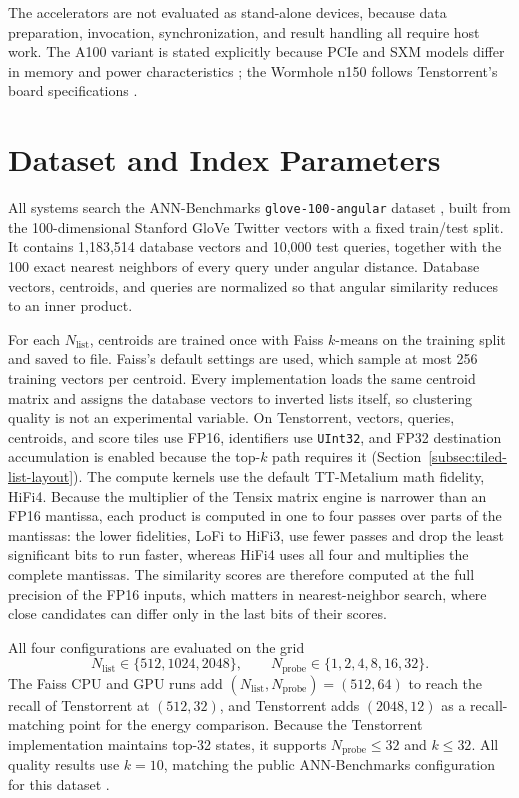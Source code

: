 The accelerators are not evaluated as stand-alone devices, because data
preparation, invocation, synchronization, and result handling all require host
work. The A100 variant is stated explicitly because PCIe and SXM models differ
in memory and power characteristics \cite{nvidia_a100_spec}; the Wormhole n150
follows Tenstorrent's board specifications \cite{tenstorrent_wormhole_spec}.

\section{Dataset and Index Parameters}
\label{sec:dataset-index-parameters}

All systems search the ANN-Benchmarks \texttt{glove-100-angular} dataset
\cite{ann_benchmarks,ann_benchmarks_datasets}, built from the 100-dimensional
Stanford GloVe Twitter vectors \cite{pennington_glove} with a fixed train/test
split. It contains 1,183,514 database vectors and 10,000 test queries, together
with the 100 exact nearest neighbors of every query under angular distance.
Database vectors, centroids, and queries are normalized so that angular
similarity reduces to an inner product.

For each \(N_{\mathrm{list}}\), centroids are trained once with Faiss
\(k\)-means on the training split and saved to file. Faiss's default
settings are used, which sample at most 256 training vectors per centroid. Every implementation loads
the same centroid matrix and assigns the database vectors to inverted lists
itself, so clustering quality is not an experimental variable. On Tenstorrent,
vectors, queries, centroids, and score tiles use FP16, identifiers use
\texttt{UInt32}, and FP32 destination accumulation is enabled because the
top-\(k\) path requires it (Section~\ref{subsec:tiled-list-layout}). The
compute kernels use the default TT-Metalium math fidelity, HiFi4. Because
the multiplier of the Tensix matrix engine is narrower than an FP16 mantissa,
each product is computed in one to four passes over parts of the mantissas:
the lower fidelities, LoFi to HiFi3, use fewer passes and drop the least
significant bits to run faster, whereas HiFi4 uses all four and multiplies the
complete mantissas. The similarity scores are therefore computed at the full
precision of the FP16 inputs, which matters in nearest-neighbor search, where
close candidates can differ only in the last bits of their scores.

All four configurations are evaluated on the grid
\begin{equation}
N_{\mathrm{list}}\in\{512,1024,2048\},
\qquad
N_{\mathrm{probe}}\in\{1,2,4,8,16,32\}.
\label{eq:parameter-grid}
\end{equation}
The Faiss CPU and GPU runs add \((N_{\mathrm{list}},N_{\mathrm{probe}})=(512,64)\)
to reach the recall of Tenstorrent at \((512,32)\), and Tenstorrent adds
\((2048,12)\) as a recall-matching point for the energy comparison. Because the
Tenstorrent implementation maintains top-32 states, it supports
\(N_{\mathrm{probe}}\leq32\) and \(k\leq32\). All quality results use
\(k=10\), matching the public ANN-Benchmarks configuration for this dataset
\cite{ann_benchmarks,ann_benchmarks_datasets}.

